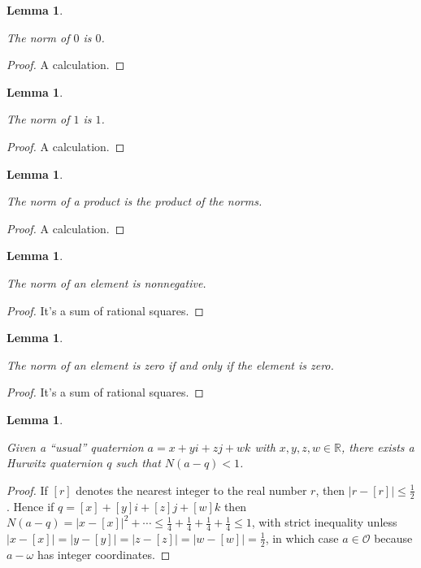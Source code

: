 \documentclass[10pt,a4paper]{article}
\newcommand{\R}{\mathbb{R}}
\newtheorem{lemma}[theorem]{Lemma}
\newcommand{\uses}[1]{}
\newcommand{\lean}[1]{}
\newcommand{\leanok}{}
\begin{document}
\begin{lemma}
    \label{Hurwitz.norm_zero}
    \lean{Hurwitz.norm_zero}
    \uses{Hurwitz.norm}
    \leanok
    The norm of $0$ is $0$.
\end{lemma}
\begin{proof}
    \leanok
    A calculation.
\end{proof}

\begin{lemma}
    \label{Hurwitz.norm_one}
    \lean{Hurwitz.norm_one}
    \uses{Hurwitz.norm}
    \leanok
    The norm of $1$ is $1$.
\end{lemma}
\begin{proof}
    \leanok
    A calculation.
\end{proof}

\begin{lemma}
    \label{Hurwitz.norm_mul}
    \lean{Hurwitz.norm_mul}
    \uses{Hurwitz.norm}
    \leanok
    The norm of a product is the product of the norms.
\end{lemma}
\begin{proof}
    \leanok
    A calculation.
\end{proof}

\begin{lemma}
    \label{Hurwitz.norm_nonneg}
    \lean{Hurwitz.norm_nonneg}
    \uses{Hurwitz.norm}
    \leanok
    The norm of an element is nonnegative.
\end{lemma}
\begin{proof} \leanok
    It's a sum of rational squares.
\end{proof}

\begin{lemma}
    \label{Hurwitz.norm_eq_zero}
    \lean{Hurwitz.norm_eq_zero}
    \uses{Hurwitz.norm}
    \leanok
    The norm of an element is zero if and only if the element is zero.
\end{lemma}
\begin{proof}
    \leanok
    It's a sum of rational squares.
\end{proof}

\begin{lemma}
    \label{Hurwitz.exists_near}
    \lean{Hurwitz.exists_near}
    \uses{Hurwitz.norm}
    \leanok
    Given a ``usual'' quaternion $a=x+yi+zj+wk$ with $x,y,z,w\in\R$,
    there exists a Hurwitz quaternion $q$ such that $N(a-q)<1$.
\end{lemma}
\begin{proof}
    \leanok
  If $[r]$ denotes the nearest integer to the real number $r$, then $|r-[r]|\leq \frac{1}{2}$.
  Hence if $q=[x]+[y]i+[z]j+[w]k$ then $N(a-q)=|x-[x]|^2+\cdots
  \leq \frac{1}{4}+\frac{1}{4}+\frac{1}{4}+\frac{1}{4}\leq 1$, with strict inequality unless
  $|x-[x]|=|y-[y]|=|z-[z]|=|w-[w]|=\frac{1}{2}$, in which case $a\in\mathcal{O}$ because $a-\omega$
  has integer coordinates.
\end{proof}
\end{document}
